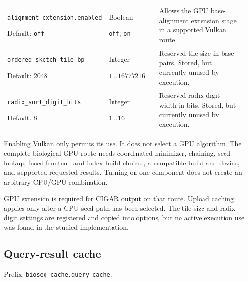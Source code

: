 \begin{longtable}{@{}>{\raggedright\arraybackslash}p{0.34\linewidth}>{\raggedright\arraybackslash}p{0.22\linewidth}>{\raggedright\arraybackslash}p{0.40\linewidth}@{}}
\nolinkurl{alignment_extension.enabled}\par Default: \texttt{off} & Boolean\par \texttt{off}, \texttt{on} & Allows the GPU base-alignment extension stage in a supported Vulkan route. \\[4pt]
\nolinkurl{ordered_sketch_tile_bp}\par Default: 2048 & Integer\par $1\ldots 16777216$ & Reserved tile size in base pairs. Stored, but currently unused by execution. \\[4pt]
\nolinkurl{radix_sort_digit_bits}\par Default: 8 & Integer\par $1\ldots 16$ & Reserved radix digit width in bits. Stored, but currently unused by execution. \\[4pt]
\end{longtable}
\endgroup

Enabling Vulkan only permits its use. It does not select a GPU algorithm.
The complete biological GPU route needs coordinated minimizer, chaining,
seed-lookup, fused-frontend and index-build choices, a compatible build and
device, and supported requested results. Turning on one component does not
create an arbitrary CPU/GPU combination.

GPU extension is required for CIGAR output on that route. Upload caching applies
only after a GPU seed path has been selected. The tile-size and radix-digit
settings are registered and copied into options, but no active execution use
was found in the studied implementation.

\subsection{Query-result cache}

Prefix: \nolinkurl{bioseq_cache.query_cache}.

